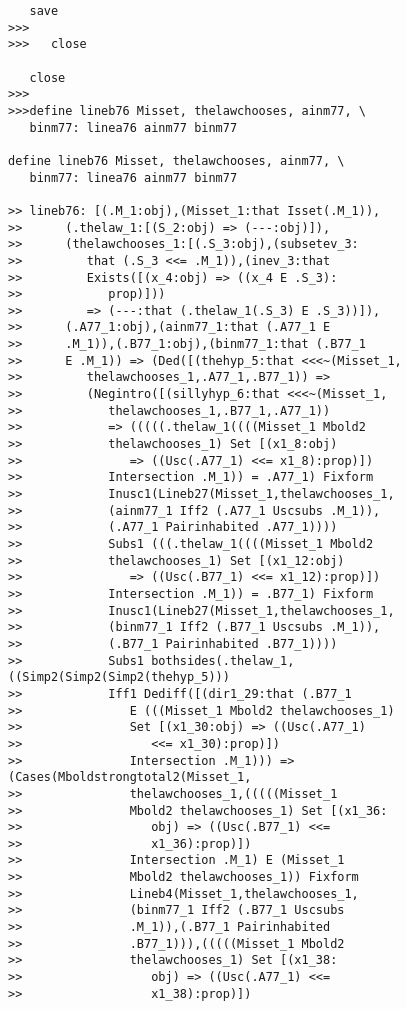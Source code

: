 \documentclass[12pt]{article}
\begin{document}
\begin{verbatim}
   save
>>>
>>>   close

   close
>>>
>>>define lineb76 Misset, thelawchooses, ainm77, \
   binm77: linea76 ainm77 binm77

define lineb76 Misset, thelawchooses, ainm77, \
   binm77: linea76 ainm77 binm77

>> lineb76: [(.M_1:obj),(Misset_1:that Isset(.M_1)),
>>      (.thelaw_1:[(S_2:obj) => (---:obj)]),
>>      (thelawchooses_1:[(.S_3:obj),(subsetev_3:
>>         that (.S_3 <<= .M_1)),(inev_3:that
>>         Exists([(x_4:obj) => ((x_4 E .S_3):
>>            prop)]))
>>         => (---:that (.thelaw_1(.S_3) E .S_3))]),
>>      (.A77_1:obj),(ainm77_1:that (.A77_1 E
>>      .M_1)),(.B77_1:obj),(binm77_1:that (.B77_1
>>      E .M_1)) => (Ded([(thehyp_5:that <<<~(Misset_1,
>>         thelawchooses_1,.A77_1,.B77_1)) =>
>>         (Negintro([(sillyhyp_6:that <<<~(Misset_1,
>>            thelawchooses_1,.B77_1,.A77_1))
>>            => (((((.thelaw_1((((Misset_1 Mbold2
>>            thelawchooses_1) Set [(x1_8:obj)
>>               => ((Usc(.A77_1) <<= x1_8):prop)])
>>            Intersection .M_1)) = .A77_1) Fixform
>>            Inusc1(Lineb27(Misset_1,thelawchooses_1,
>>            (ainm77_1 Iff2 (.A77_1 Uscsubs .M_1)),
>>            (.A77_1 Pairinhabited .A77_1))))
>>            Subs1 (((.thelaw_1((((Misset_1 Mbold2
>>            thelawchooses_1) Set [(x1_12:obj)
>>               => ((Usc(.B77_1) <<= x1_12):prop)])
>>            Intersection .M_1)) = .B77_1) Fixform
>>            Inusc1(Lineb27(Misset_1,thelawchooses_1,
>>            (binm77_1 Iff2 (.B77_1 Uscsubs .M_1)),
>>            (.B77_1 Pairinhabited .B77_1))))
>>            Subs1 bothsides(.thelaw_1,((Simp2(Simp2(Simp2(thehyp_5)))
>>            Iff1 Dediff([(dir1_29:that (.B77_1
>>               E (((Misset_1 Mbold2 thelawchooses_1)
>>               Set [(x1_30:obj) => ((Usc(.A77_1)
>>                  <<= x1_30):prop)])
>>               Intersection .M_1))) => (Cases(Mboldstrongtotal2(Misset_1,
>>               thelawchooses_1,(((((Misset_1
>>               Mbold2 thelawchooses_1) Set [(x1_36:
>>                  obj) => ((Usc(.B77_1) <<=
>>                  x1_36):prop)])
>>               Intersection .M_1) E (Misset_1
>>               Mbold2 thelawchooses_1)) Fixform
>>               Lineb4(Misset_1,thelawchooses_1,
>>               (binm77_1 Iff2 (.B77_1 Uscsubs
>>               .M_1)),(.B77_1 Pairinhabited
>>               .B77_1))),(((((Misset_1 Mbold2
>>               thelawchooses_1) Set [(x1_38:
>>                  obj) => ((Usc(.A77_1) <<=
>>                  x1_38):prop)])

\end{verbatim}
\end{document}
